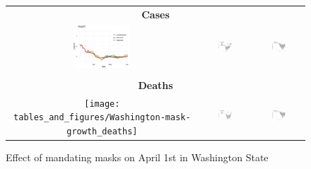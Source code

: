 \documentclass[11pt,reqno,letter]{amsart}
\theoremstyle{definition}
\begin{document}
\begin{figure}[ht]
  \caption{Effect of mandating masks on April 1st in Washington State \label{fig:WA-mask}}
  \begin{minipage}{\linewidth}
    \centering
    \begin{tabular}{ccc}
      \multicolumn{3}{c}{\textbf{Cases}} \\
      \includegraphics[width=0.31\textwidth]{tables_and_figures/Washington-mask-growth}
      &
        \includegraphics[width=0.31\textwidth]{tables_and_figures/Washington-mask-dgrowth_v1}
      &        \includegraphics[width=0.31\textwidth]{tables_and_figures/Washington-mask-dcases_v1}
      \\
      \\
      \multicolumn{3}{c}{\textbf{Deaths}}
      \\      \texttt{[image: tables\_and\_figures/Washington-mask-growth\_deaths]}
      &        \includegraphics[width=0.31\textwidth]{tables_and_figures/Washington-mask-dgrowth_deaths_v1}
      &      \includegraphics[width=0.31\textwidth]{tables_and_figures/Washington-mask-dcases_deaths_v1}

\end{tabular}
\end{minipage}
\end{figure}
\end{document}
